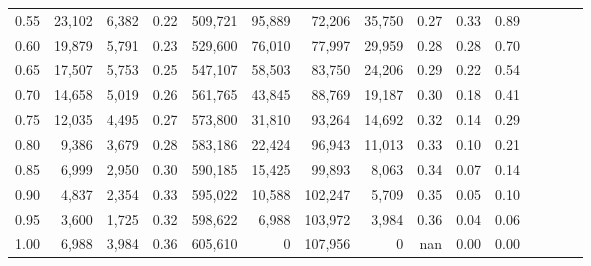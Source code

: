 \begin{tabular}{rrrcrrrrrrrrrrr}
0.55 &  23,102 &  6,382 &                                       0.22 &  509,721 &   95,889 &   72,206 &   35,750 &  0.27 &  0.33 &                         0.89 \\
0.60 &  19,879 &  5,791 &                                       0.23 &  529,600 &   76,010 &   77,997 &   29,959 &  0.28 &  0.28 &                         0.70 \\
0.65 &  17,507 &  5,753 &                                       0.25 &  547,107 &   58,503 &   83,750 &   24,206 &  0.29 &  0.22 &                         0.54 \\
0.70 &  14,658 &  5,019 &                                       0.26 &  561,765 &   43,845 &   88,769 &   19,187 &  0.30 &  0.18 &                         0.41 \\
0.75 &  12,035 &  4,495 &                                       0.27 &  573,800 &   31,810 &   93,264 &   14,692 &  0.32 &  0.14 &                         0.29 \\
0.80 &   9,386 &  3,679 &                                       0.28 &  583,186 &   22,424 &   96,943 &   11,013 &  0.33 &  0.10 &                         0.21 \\
0.85 &   6,999 &  2,950 &                                       0.30 &  590,185 &   15,425 &   99,893 &    8,063 &  0.34 &  0.07 &                         0.14 \\
0.90 &   4,837 &  2,354 &                                       0.33 &  595,022 &   10,588 &  102,247 &    5,709 &  0.35 &  0.05 &                         0.10 \\
0.95 &   3,600 &  1,725 &                                       0.32 &  598,622 &    6,988 &  103,972 &    3,984 &  0.36 &  0.04 &                         0.06 \\
1.00 &   6,988 &  3,984 &                                       0.36 &  605,610 &        0 &  107,956 &        0 &   nan &  0.00 &                         0.00 \\
\bottomrule
\end{tabular}
